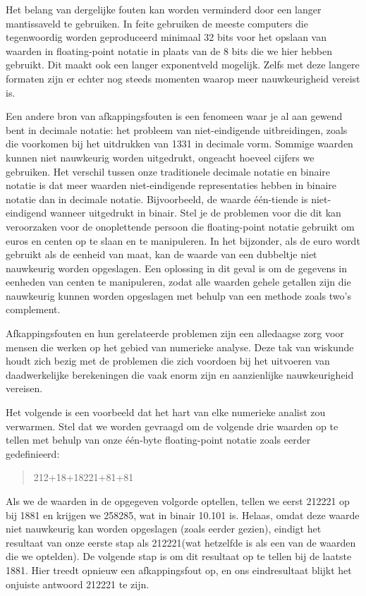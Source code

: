 Het belang van dergelijke fouten kan worden verminderd door een langer mantissaveld te gebruiken. In feite gebruiken de meeste computers die tegenwoordig worden geproduceerd minimaal 32 bits voor het opslaan van waarden in floating-point notatie in plaats van de 8 bits die we hier hebben gebruikt. Dit maakt ook een langer exponentveld mogelijk. Zelfs met deze langere formaten zijn er echter nog steeds momenten waarop meer nauwkeurigheid vereist is.

Een andere bron van afkappingsfouten is een fenomeen waar je al aan gewend bent in decimale notatie: het probleem van niet-eindigende uitbreidingen, zoals die voorkomen bij het uitdrukken van 1331​ in decimale vorm. Sommige waarden kunnen niet nauwkeurig worden uitgedrukt, ongeacht hoeveel cijfers we gebruiken. Het verschil tussen onze traditionele decimale notatie en binaire notatie is dat meer waarden niet-eindigende representaties hebben in binaire notatie dan in decimale notatie. Bijvoorbeeld, de waarde één-tiende is niet-eindigend wanneer uitgedrukt in binair. Stel je de problemen voor die dit kan veroorzaken voor de onoplettende persoon die floating-point notatie gebruikt om euros en centen op te slaan en te manipuleren. In het bijzonder, als de euro wordt gebruikt als de eenheid van maat, kan de waarde van een dubbeltje niet nauwkeurig worden opgeslagen. Een oplossing in dit geval is om de gegevens in eenheden van centen te manipuleren, zodat alle waarden gehele getallen zijn die nauwkeurig kunnen worden opgeslagen met behulp van een methode zoals two's complement.

Afkappingsfouten en hun gerelateerde problemen zijn een alledaagse zorg voor mensen die werken op het gebied van numerieke analyse. Deze tak van wiskunde houdt zich bezig met de problemen die zich voordoen bij het uitvoeren van daadwerkelijke berekeningen die vaak enorm zijn en aanzienlijke nauwkeurigheid vereisen.

Het volgende is een voorbeeld dat het hart van elke numerieke analist zou verwarmen. Stel dat we worden gevraagd om de volgende drie waarden op te tellen met behulp van onze één-byte floating-point notatie zoals eerder gedefinieerd:
\begin{quote}
212+18+18221​+81​+81​
\end{quote}
%
Als we de waarden in de opgegeven volgorde optellen, tellen we eerst 212221​ op bij 1881​ en krijgen we 258285​, wat in binair 10.101 is. Helaas, omdat deze waarde niet nauwkeurig kan worden opgeslagen (zoals eerder gezien), eindigt het resultaat van onze eerste stap als 212221​ (wat hetzelfde is als een van de waarden die we optelden). De volgende stap is om dit resultaat op te tellen bij de laatste 1881​. Hier treedt opnieuw een afkappingsfout op, en ons eindresultaat blijkt het onjuiste antwoord 212221​ te zijn.

